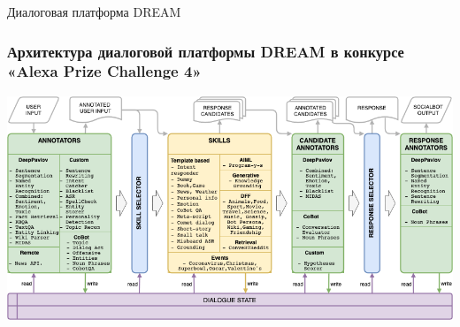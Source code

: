 \begin{frame}{Диалоговая платформа DREAM}
    \frametitle{Архитектура диалоговой платформы {DREAM} в конкурсе «Alexa Prize Challenge 4»}
    \centering
    \includegraphics[width=0.8\linewidth]{images/Alexa2_.png} 
\end{frame}

